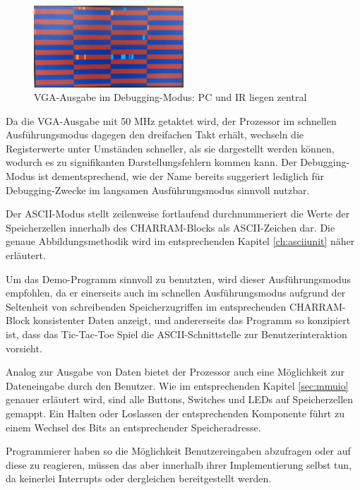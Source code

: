 \begin{figure}[H]
	\centering
		\includegraphics[width=0.5\textwidth]{debugui.png}
	\caption[VGA-Ausgabe im Debugging-Modus]{VGA-Ausgabe im Debugging-Modus: PC und IR liegen zentral}
	\label{fig:debuggingui}
\end{figure}

Da die VGA-Ausgabe mit 50 MHz getaktet wird, der Prozessor im schnellen Ausf\"uhrungsmodus dagegen den dreifachen Takt erh\"alt, wechseln die Registerwerte unter Umst\"anden schneller, als sie dargestellt werden k\"onnen, wodurch es zu signifikanten Darstellungsfehlern kommen kann. Der Debugging-Modus ist dementsprechend, wie der Name bereits suggeriert lediglich f\"ur Debugging-Zwecke im langsamen Ausf\"uhrungsmodus sinnvoll nutzbar.

Der ASCII-Modus stellt zeilenweise fortlaufend durchnummeriert die Werte der Speicherzellen innerhalb des CHARRAM-Blocks als ASCII-Zeichen dar. Die genaue Abbildungsmethodik wird im entsprechenden Kapitel \ref{ch:asciiunit} n\"aher erl\"autert.

Um das Demo-Programm sinnvoll zu benutzten, wird dieser Ausf\"uhrungsmodus empfohlen, da er einerseits auch im schnellen Ausf\"uhrungsmodus aufgrund der Seltenheit von schreibenden Speicherzugriffen im entsprechenden CHARRAM-Block konsistenter Daten anzeigt, und andererseits das Programm so konzipiert ist, dass das Tic-Tac-Toe Spiel die ASCII-Schnittstelle zur Benutzerinteraktion vorsieht.


Analog zur Ausgabe von Daten bietet der Prozessor auch eine M\"oglichkeit zur Dateneingabe durch den Benutzer. Wie im entsprechenden Kapitel \ref{sec:mmuio} genauer erläutert wird, sind alle Buttons, Switches und LEDs auf Speicherzellen gemappt. Ein Halten oder Loslassen der entsprechenden Komponente f\"uhrt zu einem Wechsel des Bits an entsprechender Speicheradresse.

Programmierer haben so die M\"oglichkeit Benutzereingaben abzufragen oder auf diese zu reagieren, m\"ussen das aber innerhalb ihrer Implementierung selbst tun, da keinerlei Interrupts oder dergleichen bereitgestellt werden.


